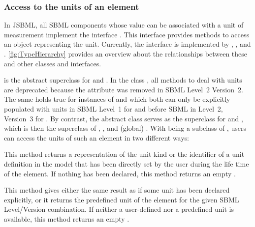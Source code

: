 \subsubsection{Access to the units of an element}

In JSBML, all SBML components whose value can be associated with a unit of
measurement implement the interface \SBaseWithUnit.  This interface provides
methods to access an object representing the unit. Currently, the interface
is implemented by \AbstractNamedSBaseWithUnit, \ExplicitRule, and
\KineticLaw.  \vref{fig:TypeHierarchy} provides an overview about the
relationships between these and other classes and interfaces.


\AbstractNamedSBaseWithUnit is the abstract superclass for \Event and
\QuantityWithUnit.  In the class \Event, all methods to deal with units are
deprecated because the  attribute was removed in SBML
Level~2 Version~2. The same holds true for instances of
\ExplicitRule and \KineticLaw which both can only be explicitly populated
with units in SBML Level~1 for \ExplicitRule and before
SBML in Level~2, Version~3 for \KineticLaw. By
contrast, the abstract class \QuantityWithUnit serves as the superclass for
\LocalParameter and \Symbol, which is then the superclass of \Compartment,
\Species, and (global) \Parameter.  With \SBaseWithUnit being a subclass of
\SBaseWithDerivedUnit, users can access the units of such an element in two
different ways:

\begin{description}[font=\normalfont]

\item[\code{getUnit()}:] This method returns a \String representation of
  the unit kind or the identifier of a unit definition in the model  that has
  been directly set by the user during the life time of the element. If
  nothing has been declared, this method returns an empty \String.

\item[\code{getDerivedUnit()}:] This method gives either the same
  result as   if some unit has
  been declared explicitly, or it returns the predefined unit of the
  element for the given SBML Level/Version combination.  If neither a
  user-defined nor a predefined unit is available, this method returns an
   empty \String.

\end{description}

